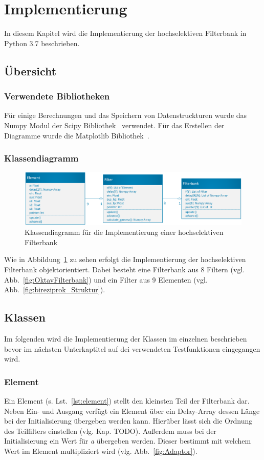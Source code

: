 \section{Implementierung}
In diesem Kapitel wird die Implementierung der hochselektiven Filterbank in Python 3.7 beschrieben.

\subsection{Übersicht}\label{sec:impl_ueber}

\subsubsection{Verwendete Bibliotheken}\label{sec:impl_bib}
Für einige Berechnungen und das Speichern von Datenstruckturen wurde das Numpy Modul der Scipy Bibliothek~\cite{scipy} verwendet. Für das Erstellen der Diagramme wurde die Matplotlib Bibliothek~\cite{Hunter:2007}.
\subsubsection{Klassendiagramm}\label{sec:impl_klass}
\begin{figure}
  \centering
  \includegraphics[width=1\textwidth]{img/klassendia}
  \caption{Klassendiagramm für die Implementierung einer hochselektiven Filterbank}\label{fig:impl_klassdia}
\end{figure}
Wie in Abbildung~\ref{fig:impl_klassdia} zu sehen erfolgt die Implementierung der hochselektiven Filterbank objektorientiert. Dabei besteht eine Filterbank aus 8 Filtern (vgl. Abb.~\ref{fig:OktavFilterbank}) und ein Filter aus 9 Elementen (vgl. Abb.~\ref{fig:bireziprok_Struktur}).
\subsection{Klassen}\label{sec:impl_klassen}
Im folgenden wird die Implementierung der Klassen im einzelnen beschrieben bevor im nächsten Unterkaptitel auf dei verwendeten Testfunktionen eingegangen wird.
\subsubsection{Element}\label{sec:impl_ele}
Ein Element (s. Lst.~\ref{lst:element}) stellt den kleinsten Teil der Filterbank dar. Neben Ein- und Ausgang verfügt ein Element über ein Delay-Array dessen Länge bei der Initialisierung übergeben werden kann. Hierüber lässt sich die Ordnung des Teilfilters einstellen (vlg. Kap. TODO). Außerdem muss bei der Initialisierung ein Wert für \emph{a} übergeben werden. Dieser bestimmt mit welchem Wert im Element multipliziert wird (vlg. Abb.~\ref{fig:Adaptor}).

